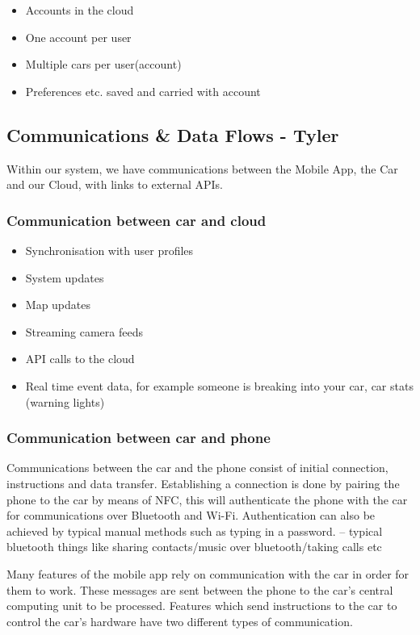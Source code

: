 \documentclass{article}
\begin{document}
\begin{itemize}
  \item Accounts in the cloud
  \item One account per user
  \item Multiple cars per user(account)
  \item Preferences etc. saved and carried with account 
\end{itemize}

\subsection{Communications \& Data Flows - Tyler}\label{ssec:communications-data}
Within our system, we have communications between the Mobile App, the Car and our Cloud, with links to external APIs.

\subsubsection{Communication between car and cloud}
\begin{itemize}
  \item Synchronisation with user profiles
  \item System updates
  \item Map updates
  \item Streaming camera feeds
  \item API calls to the cloud
  \item Real time event data, for example someone is breaking into your car, car stats (warning lights)
\end{itemize}
\subsubsection{Communication between car and phone}
Communications between the car and the phone consist of initial connection, instructions and data transfer. Establishing a connection is done by pairing the phone to the car by means of NFC, this will authenticate the phone with the car for communications over Bluetooth and Wi-Fi. Authentication can also be achieved by typical manual methods such as typing in a password. 
-- typical bluetooth things like sharing contacts/music over bluetooth/taking calls etc

Many features of the mobile app rely on communication with the car in order for them to work. These messages are sent between the phone to the car's central computing unit to be processed. Features which send instructions to the car to control the car's hardware have two different types of communication. 
\end{document}
